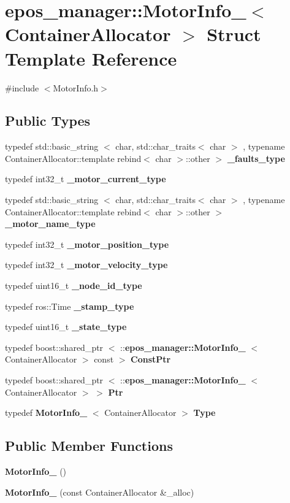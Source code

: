 \section{epos\-\_\-manager\-:\-:\-Motor\-Info\-\_\-$<$ \-Container\-Allocator $>$ \-Struct \-Template \-Reference}
\label{structepos__manager_1_1MotorInfo__}


{\ttfamily \#include $<$\-Motor\-Info.\-h$>$}

\subsection*{\-Public \-Types}
\begin{DoxyCompactItemize}
\item 
typedef std\-::basic\-\_\-string\*
$<$ char, std\-::char\-\_\-traits$<$ char $>$\*
, typename \*
\-Container\-Allocator\-::template \*
rebind$<$ char $>$\-::other $>$ {\bf \-\_\-faults\-\_\-type}
\item 
typedef int32\-\_\-t {\bf \-\_\-motor\-\_\-current\-\_\-type}
\item 
typedef std\-::basic\-\_\-string\*
$<$ char, std\-::char\-\_\-traits$<$ char $>$\*
, typename \*
\-Container\-Allocator\-::template \*
rebind$<$ char $>$\-::other $>$ {\bf \-\_\-motor\-\_\-name\-\_\-type}
\item 
typedef int32\-\_\-t {\bf \-\_\-motor\-\_\-position\-\_\-type}
\item 
typedef int32\-\_\-t {\bf \-\_\-motor\-\_\-velocity\-\_\-type}
\item 
typedef uint16\-\_\-t {\bf \-\_\-node\-\_\-id\-\_\-type}
\item 
typedef ros\-::\-Time {\bf \-\_\-stamp\-\_\-type}
\item 
typedef uint16\-\_\-t {\bf \-\_\-state\-\_\-type}
\item 
typedef boost\-::shared\-\_\-ptr\*
$<$ \-::{\bf epos\-\_\-manager\-::\-Motor\-Info\-\_\-}\*
$<$ \-Container\-Allocator $>$ const  $>$ {\bf \-Const\-Ptr}
\item 
typedef boost\-::shared\-\_\-ptr\*
$<$ \-::{\bf epos\-\_\-manager\-::\-Motor\-Info\-\_\-}\*
$<$ \-Container\-Allocator $>$ $>$ {\bf \-Ptr}
\item 
typedef {\bf \-Motor\-Info\-\_\-}\*
$<$ \-Container\-Allocator $>$ {\bf \-Type}
\end{DoxyCompactItemize}
\subsection*{\-Public \-Member \-Functions}
\begin{DoxyCompactItemize}
\item 
{\bf \-Motor\-Info\-\_\-} ()
\item 
{\bf \-Motor\-Info\-\_\-} (const \-Container\-Allocator \&\-\_\-alloc)
\end{DoxyCompactItemize}
